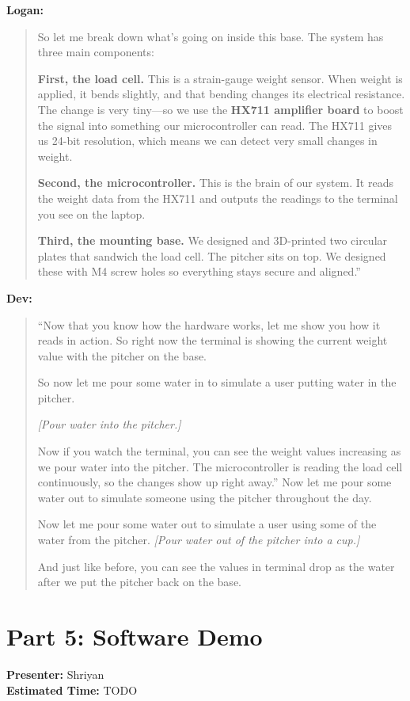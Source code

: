 \documentclass[12pt]{article}
\begin{document}
\medskip
\noindent\textbf{Logan:}
\begin{quote}
So let me break down what's going on inside this base. The system has three main components:

\textbf{First, the load cell.} This is a strain-gauge weight sensor. When weight is applied, it bends slightly, and that bending changes its electrical resistance. The change is very tiny---so we use the \textbf{HX711 amplifier board} to boost the signal into something our microcontroller can read. The HX711 gives us 24-bit resolution, which means we can detect very small changes in weight.

\textbf{Second, the microcontroller.} This is the brain of our system. It reads the weight data from the HX711 and outputs the readings to the terminal you see on the laptop.

\textbf{Third, the mounting base.} We designed and 3D-printed two circular plates that sandwich the load cell. The pitcher sits on top. We designed these with M4 screw holes so everything stays secure and aligned.''
\end{quote}

\medskip
\noindent\textbf{Dev:}
\begin{quote}
``Now that you know how the hardware works, let me show you how it reads in action. So right now the terminal is showing the current weight value with the pitcher on the base.

So now let me pour some water in to simulate a user putting water in the pitcher.

\textit{[Pour water into the pitcher.]}

Now if you watch the terminal, you can see the weight values increasing as we pour water into the pitcher. The microcontroller is reading the load cell continuously, so the changes show up right away.''
Now let me pour some water out to simulate someone using the pitcher throughout the day.


Now let me pour some water out to simulate a user using some of the water from the pitcher.
\textit{[Pour water out of the pitcher into a cup.]}
 
And just like before, you can see the values in terminal drop as the water after we put the pitcher back on the base.

\end{quote}



\section*{Part 5: Software Demo}
\noindent\textbf{Presenter:} Shriyan\\  
\noindent\textbf{Estimated Time:} TODO
\end{document}
